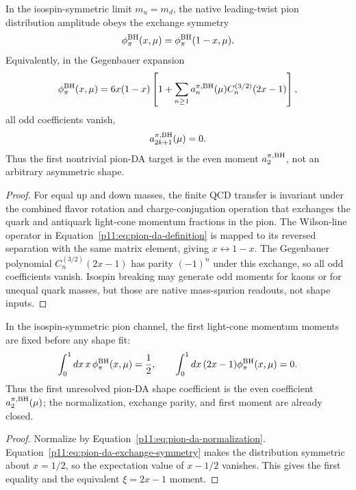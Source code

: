 \documentclass[12pt,a4paper]{article}
\begin{document}
\begin{theorem}
\label{p11:thm:isospin-symmetric-pion-da-parity}
In the isospin-symmetric limit \(m_u=m_d\), the native leading-twist pion
distribution amplitude obeys the exchange symmetry
\begin{equation}
\label{p11:eq:pion-da-exchange-symmetry}
\phi_\pi^{\rm BH}(x,\mu)=\phi_\pi^{\rm BH}(1-x,\mu).
\end{equation}
Equivalently, in the Gegenbauer expansion
\begin{equation}
\label{p11:eq:pion-da-gegenbauer-native}
\phi_\pi^{\rm BH}(x,\mu)
=6x(1-x)\left[1+\sum_{n\ge1}a_n^{\pi,\rm BH}(\mu)
C_n^{(3/2)}(2x-1)\right],
\end{equation}
all odd coefficients vanish,
\begin{equation}
\label{p11:eq:pion-da-odd-gegenbauer-vanish}
a_{2k+1}^{\pi,\rm BH}(\mu)=0.
\end{equation}
Thus the first nontrivial pion-DA target is the even moment \(a_2^{\pi,\rm BH}\),
not an arbitrary asymmetric shape.
\end{theorem}
\begin{proof}
For equal up and down masses, the finite QCD transfer is invariant under the
combined flavor rotation and charge-conjugation operation that exchanges the
quark and antiquark light-cone momentum fractions in the pion.  The Wilson-line
operator in Equation~\eqref{p11:eq:pion-da-definition} is mapped to its reversed
separation with the same matrix element, giving \(x\leftrightarrow1-x\).  The
Gegenbauer polynomial \(C_n^{(3/2)}(2x-1)\) has parity \((-1)^n\) under this
exchange, so all odd coefficients vanish.  Isospin breaking may generate odd
moments for kaons or for unequal quark masses, but those are native mass-spurion
readouts, not shape inputs.
\end{proof}


\begin{corollary}
\label{p11:cor:closed-pion-da-first-moments}
In the isospin-symmetric pion channel, the first light-cone momentum moments are
fixed before any shape fit:
\begin{equation}
\label{p11:eq:pion-da-first-moment-closure}
\int_0^1 dx\,x\,\phi_\pi^{\rm BH}(x,\mu)=\frac12,
\qquad
\int_0^1 dx\,(2x-1)\phi_\pi^{\rm BH}(x,\mu)=0 .
\end{equation}
Thus the first unresolved pion-DA shape coefficient is the even coefficient
\(a_2^{\pi,\rm BH}(\mu)\); the normalization, exchange parity, and first moment
are already closed.
\end{corollary}
\begin{proof}
Normalize by Equation~\eqref{p11:eq:pion-da-normalization}.  Equation~\eqref{p11:eq:pion-da-exchange-symmetry} makes the distribution symmetric about
\(x=1/2\), so the expectation value of \(x-1/2\) vanishes.  This gives the first
equality and the equivalent \(\xi=2x-1\) moment.
\end{proof}
\end{document}
